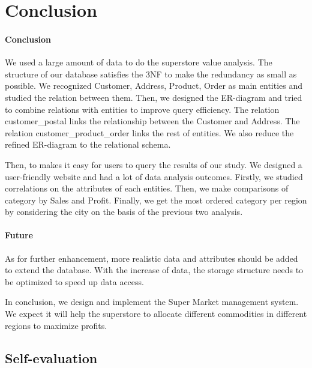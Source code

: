 \section{Conclusion}
\label{section:conclusion}
\paragraph{Conclusion}
	We used a large amount of data to do the superstore value analysis. The structure of our database satisfies the 3NF to make the redundancy as small as possible. We recognized Customer, Address, Product, Order as main entities and studied the relation between them. Then, we designed the ER-diagram and tried to combine relations with entities to improve query efficiency. The relation customer\_postal links the relationship between the Customer and Address. The relation customer\_product\_order links the rest of entities. We also reduce the refined ER-diagram to the relational schema.\par
	Then, to makes it easy for users to query the results of our study. We designed a user-friendly website and had a lot of data analysis outcomes. Firstly, we studied correlations on the attributes of each entities. Then, we make comparisons of category by Sales and Profit. Finally, we get the most ordered category per region by considering the city on the basis of the previous two analysis.\par
\paragraph{Future}
	As for further enhancement, more realistic data and attributes should be added to extend the database. With the increase of data, the storage structure needs to be optimized to speed up data access.\par
    In conclusion, we design and implement the Super Market management system. We expect it will help the superstore to allocate different commodities in different regions to maximize profits.\par
\subsection{Self-evaluation}
\label{section:self}